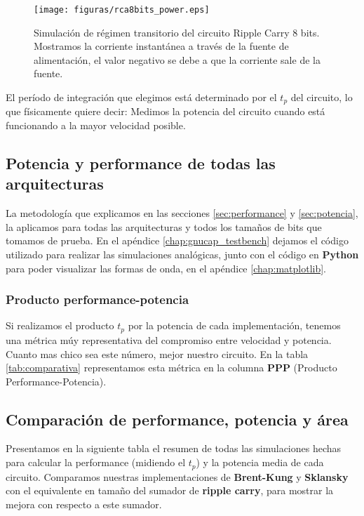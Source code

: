 \begin{figure}
  \centering
\texttt{[image: figuras/rca8bits\_power.eps]}
  \caption{Simulación de régimen transitorio del circuito Ripple Carry 8 bits. Mostramos la corriente instantánea a través de la fuente de alimentación, el valor negativo se debe a que la corriente sale de la fuente. }
\label{fig:sim_rca8_pow}
\end{figure}
El período de integración que elegimos está determinado por el $t_p$ del circuito, lo que físicamente quiere decir: Medimos la potencia del circuito cuando está funcionando a la mayor velocidad posible. 

\subsection{Potencia y performance de todas las arquitecturas}
La metodología que explicamos en las secciones \ref{sec:performance} y \ref{sec:potencia}, la aplicamos para todas las arquitecturas y todos los tamaños de bits que tomamos de prueba. En el apéndice \ref{chap:gnucap_testbench} dejamos el código utilizado para realizar las simulaciones analógicas, junto con el código en \textbf{Python} para poder visualizar las formas de onda, en el apéndice \ref{chap:matplotlib}.
\subsubsection{Producto performance-potencia}
Si realizamos el producto $t_p$ por la potencia de cada implementación, tenemos una métrica múy representativa del compromiso entre velocidad y potencia. Cuanto mas chico sea este número, mejor nuestro circuito. En la tabla \ref{tab:comparativa} representamos esta métrica en la columna \textbf{PPP} (Producto Performance-Potencia).

\subsection{Comparación de performance, potencia y área}\label{subsec:comparativa}
	
Presentamos en la siguiente tabla el resumen de todas las simulaciones hechas para calcular la performance (midiendo el $t_p$) y la potencia media de cada circuito. Comparamos nuestras implementaciones de \textbf{Brent-Kung} y \textbf{Sklansky} con el equivalente en tamaño del sumador de \textbf{ripple carry}, para mostrar la mejora con respecto a este sumador.

